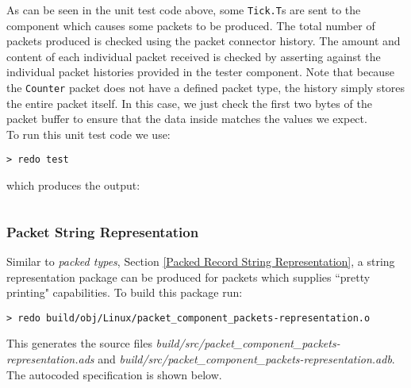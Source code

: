 As can be seen in the unit test code above, some \texttt{Tick.T}s are sent to the component which causes some packets to be produced. The total number of packets produced is checked using the packet connector history. The amount and content of each individual packet received is checked by asserting against the individual packet histories provided in the tester component. Note that because the \texttt{Counter} packet does not have a defined packet type, the history simply stores the entire packet itself. In this case, we just check the first two bytes of the packet buffer to ensure that the data inside matches the values we expect. \\

To run this unit test code we use:

\vspace{5mm} %
\begin{verbatim}
> redo test
\end{verbatim}
\vspace{5mm} %

which produces the output:

\vspace{5mm} %
\inputminted{text}{../example_architecture/packet_component/test/output.txt}
\vspace{5mm} %

\subsubsection{Packet String Representation} \label{Packet String Representation}

Similar to \textit{packed types}, Section \ref{Packed Record String Representation}, a string representation package can be produced for packets which supplies ``pretty printing" capabilities. To build this package run:

\vspace{5mm} %
\begin{verbatim}
> redo build/obj/Linux/packet_component_packets-representation.o
\end{verbatim}
\vspace{5mm} %

This generates the source files \textit{build/src/packet\_component\_packets-representation.ads} and \textit{build/src/packet\_component\_packets-representation.adb}. The autocoded specification is shown below.

